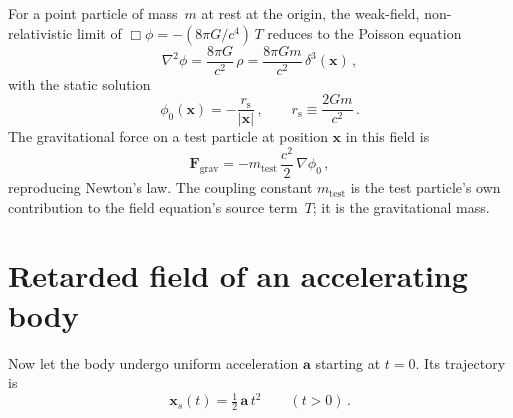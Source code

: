 \documentclass[11pt]{article}
\newcommand{\rs}{r_{\mathrm{s}}}
\newcommand{\half}{\tfrac{1}{2}}
\begin{document}
For a point particle of mass~$m$ at rest at the origin,
the weak-field, non-relativistic limit of
$\Box\phi = -(8\pi G/c^4)\,T$ reduces to the Poisson
equation
\begin{equation}\label{eq:poisson_app17}
  \nabla^2\phi = \frac{8\pi G}{c^2}\,\rho
  = \frac{8\pi Gm}{c^2}\,\delta^3(\mathbf{x})\,,
\end{equation}
with the static solution
\begin{equation}\label{eq:phi_static_app17}
  \phi_0(\mathbf{x}) = -\frac{\rs}{|\mathbf{x}|}\,,
  \qquad \rs \equiv \frac{2Gm}{c^2}\,.
\end{equation}
The gravitational force on a test particle at position
$\mathbf{x}$ in this field is
\begin{equation}\label{eq:F_grav_app17}
  \mathbf{F}_{\mathrm{grav}} =
  -m_{\mathrm{test}}\,\frac{c^2}{2}\,\nabla\phi_0\,,
\end{equation}
reproducing Newton's law.  The coupling constant
$m_{\mathrm{test}}$ is the test particle's own
contribution to the field equation's source term~$T$;
it is the gravitational mass.

\section{Retarded field of an accelerating body}
\label{sec:retarded}

Now let the body undergo uniform acceleration
$\mathbf{a}$ starting at $t = 0$.  Its trajectory is
\begin{equation}\label{eq:trajectory}
  \mathbf{x}_s(t) = \half\,\mathbf{a}\,t^2
  \qquad (t > 0)\,.
\end{equation}
\end{document}
